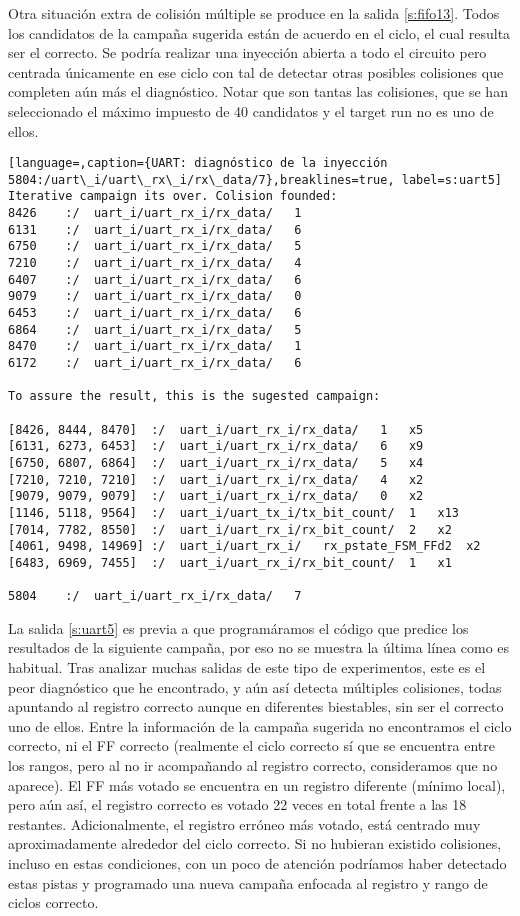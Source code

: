 Otra situación extra de colisión múltiple se produce en la salida \ref{s:fifo13}.
Todos los candidatos de la campaña sugerida están de acuerdo en el ciclo, el cual
resulta ser el correcto. Se podría realizar una inyección abierta a todo el 
circuito pero centrada únicamente en ese ciclo con tal de detectar otras posibles
colisiones que completen aún más el diagnóstico. Notar que son tantas las
colisiones, que se han seleccionado el máximo impuesto de 40 candidatos y el
target run no es uno de ellos.

\begin{lstlisting}[language=,caption={UART: diagnóstico de la inyección
5804:/uart\_i/uart\_rx\_i/rx\_data/7},breaklines=true, label=s:uart5]
Iterative campaign its over. Colision founded:
8426	:/	uart_i/uart_rx_i/rx_data/	1
6131	:/	uart_i/uart_rx_i/rx_data/	6
6750	:/	uart_i/uart_rx_i/rx_data/	5
7210	:/	uart_i/uart_rx_i/rx_data/	4
6407	:/	uart_i/uart_rx_i/rx_data/	6
9079	:/	uart_i/uart_rx_i/rx_data/	0
6453	:/	uart_i/uart_rx_i/rx_data/	6
6864	:/	uart_i/uart_rx_i/rx_data/	5
8470	:/	uart_i/uart_rx_i/rx_data/	1
6172	:/	uart_i/uart_rx_i/rx_data/	6

To assure the result, this is the sugested campaign:

[8426, 8444, 8470]	:/	uart_i/uart_rx_i/rx_data/	1	x5
[6131, 6273, 6453]	:/	uart_i/uart_rx_i/rx_data/	6	x9
[6750, 6807, 6864]	:/	uart_i/uart_rx_i/rx_data/	5	x4
[7210, 7210, 7210]	:/	uart_i/uart_rx_i/rx_data/	4	x2
[9079, 9079, 9079]	:/	uart_i/uart_rx_i/rx_data/	0	x2
[1146, 5118, 9564]	:/	uart_i/uart_tx_i/tx_bit_count/	1	x13
[7014, 7782, 8550]	:/	uart_i/uart_rx_i/rx_bit_count/	2	x2
[4061, 9498, 14969]	:/	uart_i/uart_rx_i/	rx_pstate_FSM_FFd2	x2
[6483, 6969, 7455]	:/	uart_i/uart_rx_i/rx_bit_count/	1	x1

5804	:/	uart_i/uart_rx_i/rx_data/	7
\end{lstlisting}

La salida \ref{s:uart5} es previa a que programáramos el código que predice los
resultados de la siguiente campaña, por eso no se muestra la última línea como es
habitual. Tras analizar muchas salidas de este tipo de experimentos, este es el 
peor diagnóstico que he encontrado, y aún así detecta múltiples colisiones, 
todas apuntando al registro correcto aunque en diferentes biestables, sin ser el
correcto uno de ellos. Entre la información de la campaña sugerida no encontramos 
el ciclo correcto, ni el \gls{FF} correcto (realmente el ciclo correcto sí que se
encuentra entre los rangos, pero al no ir acompañando al registro correcto,
consideramos que no aparece). El \gls{FF} más votado se encuentra en un registro 
diferente (mínimo local), pero aún así, el registro correcto es votado 22 veces en
total frente a las 18 restantes. Adicionalmente, el registro erróneo más votado, 
está centrado muy aproximadamente alrededor del ciclo correcto. Si no hubieran 
existido colisiones, incluso en estas condiciones, con un poco de atención
podríamos haber detectado estas pistas y programado una nueva campaña enfocada al
registro y rango de ciclos correcto.

